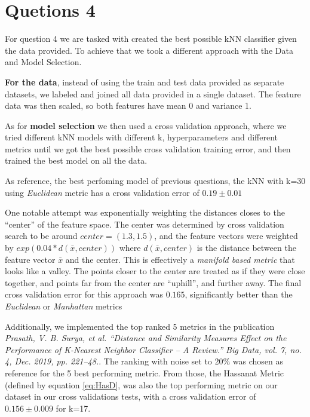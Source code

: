 \section*{Quetions 4}

For question 4 we are tasked with created the best possible
kNN classifier given the data provided. To achieve that we took a different
approach with the Data and Model Selection.

{\bf For the data}, instead of using the train and test data provided as separate datasets,
we labeled and joined all data provided in a single dataset. The feature data was then scaled, so
both features have mean 0 and variance 1.

As for {\bf model selection} we then used a cross validation approach, where we tried different
kNN models with different k, hyperparameters and different metrics until we got the best
possible cross validation training error, and then trained the best model on all the data.

As reference, the best perfoming model of previous questions, the kNN with k=30 using
{\it Euclidean} metric has a cross validation error of $0.19 \pm 0.01$

One notable attempt was exponentially weighting the distances closes to the ``center'' of the feature space.
The center was determined by cross validation search to be around $center=(1.3, 1.5)$, and the feature vectors were
weighted by $exp(0.04*d(\bar{x}, center))$ where $d(\bar{x}, center)$ is the distance between the feature vector
$\bar{x}$ and the center. This is effectively a \textit{manifold based metric} that looks like a valley. The
points closer to the center are treated as if they were close together, and points far from the center
are ``uphill'', and further away. The final cross validation error for this approach was $0.165$, significantly
better than the \textit{Euclidean} or \textit{Manhattan} metrics


Additionally, we implemented the top ranked 5 metrics in the publication {\it Prasath, V. B. Surya, et al. “Distance and Similarity Measures Effect on the Performance of K-Nearest Neighbor Classifier -- A Review.” Big Data, vol. 7, no. 4, Dec. 2019, pp. 221–48.}. The ranking with noise set to 20\% was chosen
as reference for the 5 best performing metric. From those, the Hassanat Metric (defined by equation \ref{eq:HasD}, was also the top performing metric on our dataset
in our cross validations tests, with a cross validation error of $0.156 \pm 0.009$ for k=17.

